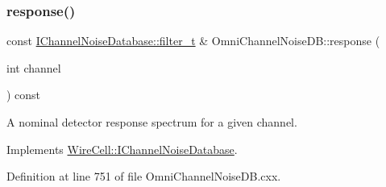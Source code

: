 \subsubsection{\texorpdfstring{response()}{response()}}
{\footnotesize\ttfamily const \hyperlink{class_wire_cell_1_1_i_channel_noise_database_a0acbae29743542eb1c652f7a56e692f5}{I\+Channel\+Noise\+Database\+::filter\+\_\+t} \& Omni\+Channel\+Noise\+D\+B\+::response (\begin{DoxyParamCaption}\item[{int}]{channel }\end{DoxyParamCaption}) const\hspace{0.3cm}{\ttfamily [virtual]}}



A nominal detector response spectrum for a given channel. 



Implements \hyperlink{class_wire_cell_1_1_i_channel_noise_database_ad3c42f59a26e8a8e115199a894d881da}{Wire\+Cell\+::\+I\+Channel\+Noise\+Database}.



Definition at line 751 of file Omni\+Channel\+Noise\+D\+B.\+cxx.

